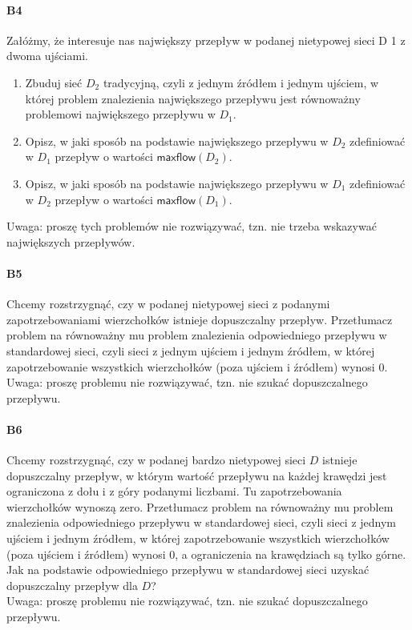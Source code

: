 \documentclass[a4paper,12pt]{article}
\theoremstyle{definition}%
\theoremstyle{definition}
\theoremstyle{problem}
\begin{document}
\paragraph{B4} Załóżmy, że interesuje nas największy przepływ w podanej nietypowej sieci D 1 z dwoma ujściami.
\begin{enumerate}[label=\alph*)]
\item Zbuduj sieć $D_2$ tradycyjną, czyli z jednym źródłem i jednym ujściem, w której problem znalezienia największego przepływu jest równoważny problemowi największego przepływu w $D_1$.
\item Opisz, w jaki sposób na podstawie największego przepływu w $D_2$ zdefiniować w $D_1$ przepływ o wartości $\mathsf{maxflow}(D_2)$.
\item Opisz, w jaki sposób na podstawie największego przepływu w $D_1$ zdefiniować w $D_2$ przepływ o wartości $\mathsf{maxflow}(D_1)$.
\end{enumerate}
Uwaga: proszę tych problemów nie rozwiązywać, tzn. nie trzeba wskazywać największych przepływów.

\paragraph{B5} Chcemy rozstrzygnąć, czy w podanej nietypowej sieci z podanymi zapotrzebowaniami wierzchołków istnieje dopuszczalny przepływ. Przetłumacz problem na równoważny mu problem znalezienia odpowiedniego przepływu w standardowej sieci, czyli sieci z jednym ujściem i jednym źródłem, w której zapotrzebowanie wszystkich wierzchołków (poza ujściem i źródłem) wynosi 0.
Uwaga: proszę problemu nie rozwiązywać, tzn. nie szukać dopuszczalnego przepływu.

\paragraph{B6} Chcemy rozstrzygnąć, czy w podanej bardzo nietypowej sieci $D$ istnieje dopuszczalny przepływ, w którym wartość przepływu na każdej krawędzi jest ograniczona z dołu i z góry podanymi liczbami. Tu zapotrzebowania wierzchołków wynoszą zero. Przetłumacz problem na równoważny mu problem znalezienia odpowiedniego przepływu w standardowej sieci, czyli sieci z jednym ujściem i jednym źródłem, w której zapotrzebowanie wszystkich wierzchołków (poza ujściem i źródłem) wynosi 0, a ograniczenia na krawędziach są tylko górne. Jak na podstawie odpowiedniego przepływu w standardowej sieci uzyskać dopuszczalny przepływ dla $D$?\\
Uwaga: proszę problemu nie rozwiązywać, tzn. nie szukać dopuszczalnego przepływu.
\end{document}
